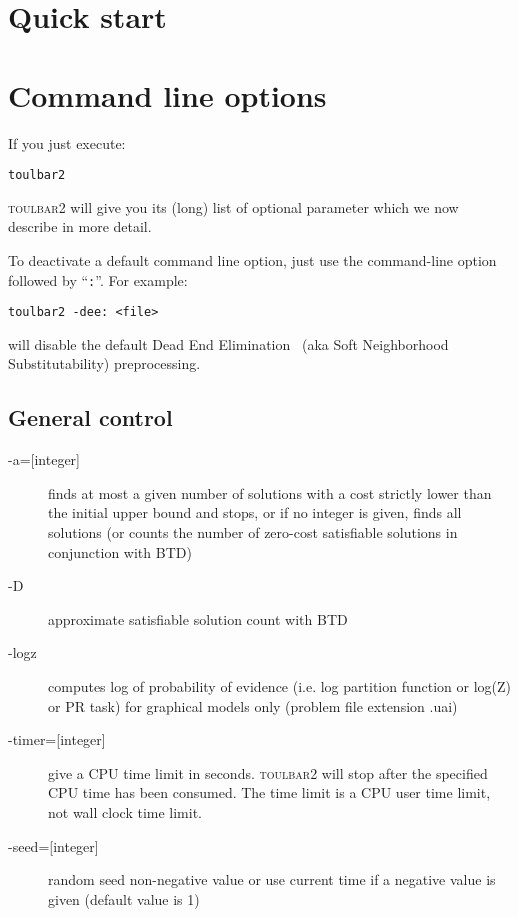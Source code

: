 \documentclass{article}
\def\toulbar2{\textsc{toulbar2}}
\begin{document}
\section{Quick start}
\label{quickstart}



\section{Command line options}

If you just execute:

\begin{verbatim}
toulbar2
\end{verbatim}

\toulbar2 will give you its (long) list of optional parameter which we
now describe in more detail. 


To deactivate a default command line option, just use the
command-line option followed by ``\texttt{:}''. For example:

\begin{verbatim}
toulbar2 -dee: <file>
\end{verbatim}

will disable the default Dead End Elimination~\cite{Givry13a} (aka Soft Neighborhood
Substitutability) preprocessing.


\subsection{General control}

\begin{description}
\item[{-a=[integer]}] finds at most a given number of solutions with a cost strictly lower than the initial upper bound and stops, 
or if no integer is given, finds all solutions (or counts the number of zero-cost satisfiable solutions in conjunction with BTD)
\item[{-D}] approximate satisfiable solution count with BTD
\item[{-logz}] computes log of probability of evidence (i.e. log
  partition function or log(Z) or PR task) for graphical models only
  (problem file extension .uai)
\item[{-timer=[integer]}] give a CPU time limit in seconds. \toulbar2
  will stop after the specified CPU time has been consumed. The time
  limit is a CPU user time limit, not wall clock time limit.
\item[{-seed=[integer]}] random seed non-negative value or use current time if a negative value is given (default value is 1)
\end{description}
\end{document}
